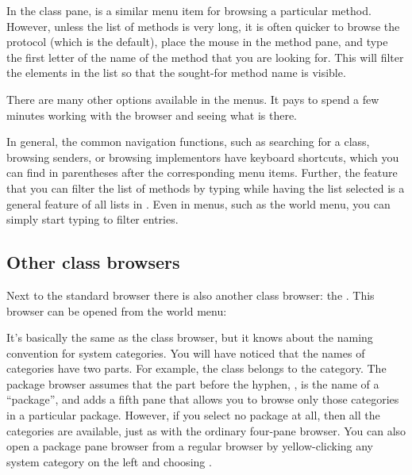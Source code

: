 \documentclass[a4paper,10pt,twoside]{book}
\begin{document}
In the class pane,  is a similar menu item for browsing a particular method.
However, unless the list of methods is very long, it is often quicker to browse the  protocol (which is the default), place the mouse in the method pane, and type the first letter of the name of the method that you are looking for.
This will filter the elements in the list so that the sought-for method name is visible.


There are many other options available in the menus.
It pays to spend a few minutes working with the browser and seeing what is there.


In general, the common navigation functions, such as searching for a class, browsing senders, or browsing implementors have keyboard shortcuts, which you can find in parentheses after the corresponding menu items.
Further, the feature that you can filter the list of methods by typing while having the list selected is a general feature of all lists in \sq.
Even in menus, such as the world menu, you can simply start typing to filter entries.

\subsection{Other class browsers}
\label{sec:otherBrowsers}

Next to the standard browser there is also another class browser: the .
This browser can be opened from the world menu: 

It's basically the same as the class browser, but it knows about the naming convention for system categories.
You will have noticed that the names of categories have two parts.
For example, the  class belongs to the  category.
\label{sec:package-names}
The package browser assumes that the part before the hyphen, , is the name of a ``package'', and adds a fifth pane that allows you to browse only those categories in a particular package.
However, if you select no package at all, then all the categories are available, just as with the ordinary four-pane browser.
You can also open a package pane browser from a regular browser by yellow-clicking any system category on the left and choosing .
\end{document}
